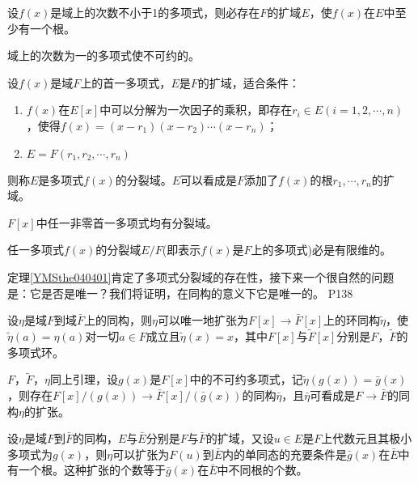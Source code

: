 \begin{corollary}[Kronecker定理]
	设$f(x)$是域上的次数不小于1的多项式，则必存在$F$的扩域$E$，使$f(x)$在$E$中至少有一个根。
\end{corollary}
\begin{hint}
	域上的次数为一的多项式使不可约的。
\end{hint}


\begin{definition}
	设$f(x)$是域$F$上的首一多项式，$E$是$F$的扩域，适合条件：
	\begin{enumerate}
		\item $f(x)$在$E[x]$中可以分解为一次因子的乘积，即存在$r_{i}\in E(i=1,2,\cdots,n)$，使得$f(x)=(x-r_{1})(x-r_{2})\cdots(x-r_{n})$；
		\item $E=F(r_{1},r_{2},\cdots,r_{n})$
	\end{enumerate}
	则称$E$是多项式$f(x)$的分裂域。$E$可以看成是$F$添加了$f(x)$的根$r_{1},\cdots,r_{n}$的扩域。
\end{definition}

\begin{theorem}\label{YMSthe040401}
	$F[x]$中任一非零首一多项式均有分裂域。
\end{theorem}

\begin{proposition}
	任一多项式$f(x)$的分裂域$E/F$(即表示$f(x)$是$F$上的多项式)必是有限维的。
\end{proposition}

\original
{
	定理\ref{YMSthe040401}肯定了多项式分裂域的存在性，接下来一个很自然的问题是：它是否是唯一？我们将证明，在同构的意义下它是唯一的。
}
{P138}

\begin{lemma}
	设$\eta$是域$F$到域$\bar{F}$上的同构，则$\eta$可以唯一地扩张为$F[x]\rightarrow \bar{F}[x]$上的环同构$\tilde{\eta}$，使$\tilde{\eta}(a)=\eta(a)$对一切$a\in F$成立且$\tilde{\eta}(x)=x$，其中$F[x]$与$\tilde{F}[x]$分别是$F$，$\tilde{F}$的多项式环。
\end{lemma}

\begin{lemma}
	$F$，$\tilde{F}$，$\eta$同上引理，设$g(x)$是$F[x]$中的不可约多项式，记$\tilde{\eta}(g(x))=\bar{g}(x)$，则存在$F[x]/(g(x))\rightarrow \bar{F}[x]/(\bar{g}(x))$的同构$\bar{\eta}$，且$\bar{\eta}$可看成是$F\rightarrow \bar{F}$的同构$\eta$的扩张。
\end{lemma}


\begin{lemma}
	设$\eta$是域$F$到$\bar{F}$的同构，$E$与$\bar{E}$分别是$F$与$\bar{F}$的扩域，又设$u\in E$是$F$上代数元且其极小多项式为$g(x)$，则$\eta$可以扩张为$F(u)$到$\bar{E}$内的单同态的充要条件是$\bar{g}(x)$在$\bar{E}$中有一个根。这种扩张的个数等于$\bar{g}(x)$在$\bar{E}$中不同根的个数。
\end{lemma}


